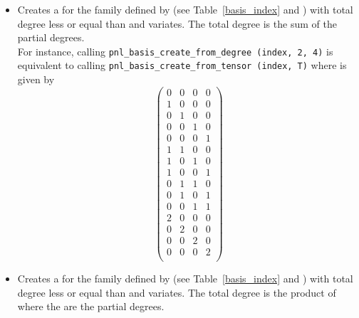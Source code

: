 \begin{itemize}
\item {}
  \sshortdescribe Creates a  for the family
  defined by  (see Table~\ref{basis_index} and ) with total degree less
  or equal than  and  variates. The total degree is
  the sum of the partial degrees.\\
  For instance, calling \verb!pnl_basis_create_from_degree (index, 2, 4)! is
  equivalent to calling \verb!pnl_basis_create_from_tensor (index, T)! where
   is given by
  \[ \left(
    \begin{array}{cccc}
      0 & 0 & 0 & 0\\
      1 & 0 & 0 & 0\\
      0 & 1 & 0 & 0\\
      0 & 0 & 1 & 0\\
      0 & 0 & 0 & 1\\
      1 & 1 & 0 & 0\\
      1 & 0 & 1 & 0\\
      1 & 0 & 0 & 1\\
      0 & 1 & 1 & 0\\
      0 & 1 & 0 & 1\\
      0 & 0 & 1 & 1\\
      2 & 0 & 0 & 0\\
      0 & 2 & 0 & 0\\
      0 & 0 & 2 & 0\\
      0 & 0 & 0 & 2\\
    \end{array}
  \right) \]
\item {}
  \sshortdescribe Creates a  for the family
  defined by  (see Table~\ref{basis_index} and ) with total degree less
  or equal than  and  variates. The total degree is
  the product of  where the  are the partial degrees.



\end{itemize}
